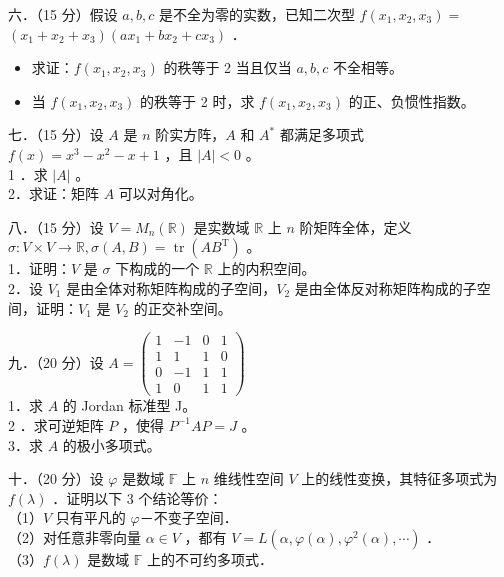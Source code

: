 \documentclass{article}
\begin{document}
六．（15 分）假设 \(a, b, c\) 是不全为零的实数，已知二次型 \(f\left(x_{1}, x_{2}, x_{3}\right)=\) \(\left(x_{1}+x_{2}+x_{3}\right)\left(a x_{1}+b x_{2}+c x_{3}\right)\) ．

\begin{itemize}

  \item[1．] 求证：\(f\left(x_{1}, x_{2}, x_{3}\right)\) 的秩等于 2 当且仅当 \(a, b, c\) 不全相等。

  \item[2．] 当 \(f\left(x_{1}, x_{2}, x_{3}\right)\) 的秩等于 2 时，求 \(f\left(x_{1}, x_{2}, x_{3}\right)\) 的正、负惯性指数。
\end{itemize}

七．（15 分）设 \(A\) 是 \(n\) 阶实方阵，\(A\) 和 \(A^{*}\) 都满足多项式 \(f(x)=x^{3}-x^{2}-x+1\) ，且 \(|A|<0\) 。\\

1 ．求 \(|A|\) 。\\

2．求证：矩阵 \(A\) 可以对角化。

八．（15 分）设 \(V=M_{n}(\mathbb{R})\) 是实数域 \(\mathbb{R}\) 上 \(n\) 阶矩阵全体，定义 \(\sigma: V \times V \rightarrow \mathbb{R}, \sigma(A, B)=\operatorname{tr}\left(A B^{\mathrm{T}}\right)\) 。\\

1．证明：\(V\) 是 \(\sigma\) 下构成的一个 \(\mathbb{R}\) 上的内积空间。\\

2．设 \(V_{1}\) 是由全体对称矩阵构成的子空间，\(V_{2}\) 是由全体反对称矩阵构成的子空间，证明：\(V_{1}\) 是 \(V_{2}\) 的正交补空间。

九．（20 分）设 \(A=\left(\begin{array}{cccc}1 & -1 & 0 & 1 \\ 1 & 1 & 1 & 0 \\ 0 & -1 & 1 & 1 \\ 1 & 0 & 1 & 1\end{array}\right)\)\\

1．求 \(A\) 的 Jordan 标准型 J。\\

2 ．求可逆矩阵 \(P\) ，使得 \(P^{-1} A P=J\) 。\\

3．求 \(A\) 的极小多项式。

十．（20 分）设 \(\varphi\) 是数域 \(\mathbb{F}\) 上 \(n\) 维线性空间 \(V\) 上的线性变换，其特征多项式为 \(f(\lambda)\) ．证明以下 3 个结论等价：\\
（1）\(V\) 只有平凡的 \(\varphi\)－不变子空间．\\
（2）对任意非零向量 \(\alpha \in V\) ，都有 \(V=L\left(\alpha, \varphi(\alpha), \varphi^{2}(\alpha), \cdots\right)\) ．\\
（3）\(f(\lambda)\) 是数域 \(\mathbb{F}\) 上的不可约多项式．
\end{document}
